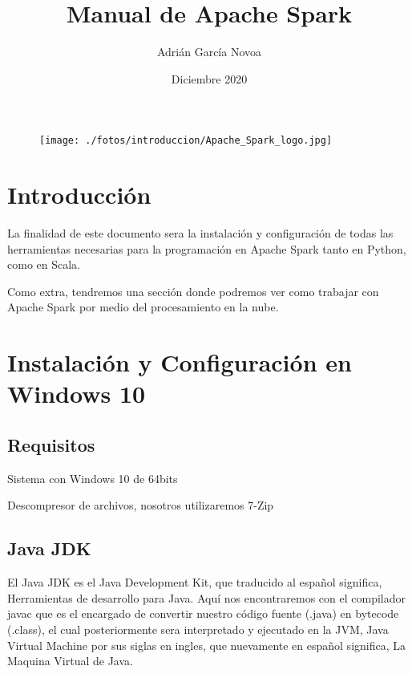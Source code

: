 \documentclass[a4paper,10pt]{article}
\title{Manual de Apache Spark}
\author{Adrián García Novoa}
\date{Diciembre 2020}
\begin{document}
\begin{figure}[H]
\begin{center}
\texttt{[image: ./fotos/introduccion/Apache\_Spark\_logo.jpg]}
\end{center}
\end{figure}
\clearpage

\lhead{\leftmark}
\chead{}
\renewcommand{\headrulewidth}{0.4pt}
\lfoot{}
\cfoot{\thepage}
\rfoot{}
\renewcommand{\footrulewidth}{0.4pt}

\tableofcontents
\clearpage

\lhead{\leftmark}

\section{Introducción}

La finalidad de este documento sera la instalación y configuración de todas las herramientas necesarias para la programación en Apache Spark tanto en Python, como en Scala. 

Como extra, tendremos una sección donde podremos ver como trabajar con Apache Spark por medio del procesamiento en la nube.
	
\clearpage		

\section{Instalación y Configuración en Windows 10}

\subsection{Requisitos}

Sistema con Windows 10 de 64bits

Descompresor de archivos, nosotros utilizaremos 7-Zip

 \clearpage

\subsection{Java JDK}

El Java JDK es el Java Development Kit, que traducido al español significa, Herramientas de desarrollo para Java. Aquí nos encontraremos con el compilador javac que es el encargado de convertir nuestro código fuente (.java) en bytecode (.class), el cual posteriormente sera interpretado y ejecutado en la JVM, Java Virtual Machine por sus siglas en ingles, que nuevamente en español significa, La Maquina Virtual de Java. 
\end{document}
